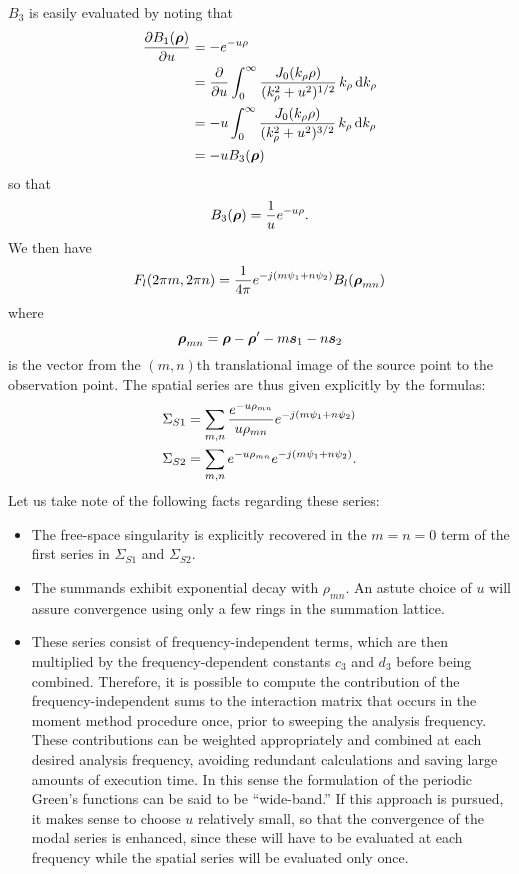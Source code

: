 $B_3$ is easily evaluated by noting that 
\begin{align}
  \frac{\partial B_1(\boldsymbol{\rho})}{\partial u} 
  &=
  - e^{-u{\rho}} \nonumber \\
  &= 
   \frac{\partial }{\partial u} \int_0^{\infty} 
  \frac{J_0(k_{\rho} {\rho})} 
  {(k_{\rho}^2 + u^2)^{1/2}} \, k_{\rho} \, \text{d} k_{\rho} 
  \nonumber \\
  &= 
  -u \int_0^{\infty} 
  \frac{J_0(k_{\rho} {\rho})} 
  {(k_{\rho}^2 + u^2)^{3/2}} \, k_{\rho} \, \text{d} k_{\rho} 
  \nonumber \\
  &= 
  -u B_3(\boldsymbol{\rho})
\end{align}
so that 
\begin{equation}
  B_3(\boldsymbol{\rho}) = \frac{1}{u} e^{-u {\rho}}.
\end{equation}
We then have
\begin{equation}
  F_l(2\pi m, 2\pi n) = \frac{1}{4\pi} e^{-j(m\psi_1 + n\psi_2)}
  B_l(\boldsymbol{\rho}_{mn})
\end{equation}
where
\begin{equation}
  \boldsymbol{\rho}_{mn} = \boldsymbol{\rho} - \boldsymbol{\rho}' - m\boldsymbol{s}_1 - n\boldsymbol{s}_2
\end{equation}
is the vector from the $(m,n)$th
translational image of the source point to the observation point.  
The spatial series are thus
given explicitly by the formulas:
\begin{subequations}
  \begin{align}
    \Sigma_{S1}
    &= 
    \sum_{m,n} 
    \frac{e^{-u\rho_{mn}}}{u\rho_{mn}} e^{-j(m\psi_1 + n\psi_2)}
    \\
    \Sigma_{S2}
    &= 
    \sum_{m,n} 
    e^{-u\rho_{mn}} e^{-j(m\psi_1 + n\psi_2)}.
  \end{align}
\end{subequations}
Let us take note of the following facts regarding these series:
\begin{itemize}
\item The free-space singularity is explicitly recovered in the $m=n=0$
term of the first series in $\Sigma_{S1}$ and $\Sigma_{S2}$.
\item The summands exhibit exponential decay with $\rho_{mn}$.  An
  astute choice of $u$ will assure convergence using only a few rings
  in the summation lattice.
\item These series consist of frequency-independent terms, which are
  then multiplied by the frequency-dependent constants $c_3$ and $d_3$
  before being combined.  Therefore, it is possible to compute the
  contribution of the frequency-independent sums to the interaction
  matrix that occurs in the moment method procedure once, prior to
  sweeping the analysis frequency.  These contributions can be
  weighted appropriately and combined at each desired analysis
  frequency, avoiding redundant calculations and saving large amounts
  of execution time.  In this sense the formulation of the periodic
  Green's functions can be said to be ``wide-band.''  If this approach
  is pursued, it makes sense to choose $u$ relatively small, so that
  the convergence of the modal series is enhanced, since these will
  have to be evaluated at each frequency while the spatial series will
  be evaluated only once.
\end{itemize}
